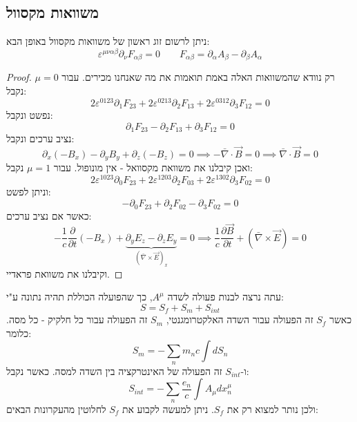 \documentclass{tstextbook}
\begin{document}
\subsection{משוואות מקסוול}

\begin{proposition}
ניתן לרשום זוג ראשון של משוואות מקסוול באופן הבא:
$$\varepsilon^{\mu \nu \alpha \beta}\partial_{\nu}F_{\alpha \beta}=0\qquad F_{\alpha \beta}=\partial_{\alpha}A_{\beta}-\partial_{\beta}A_{\alpha}$$

\end{proposition}
\begin{proof}
רק נוודא שהמשוואות האלה באמת תואמות את מה שאנחנו מכירים. עבור \(\mu=0\) נקבל:
$$2\varepsilon^{0123}\partial_{1}F_{23}+2\varepsilon^{0213}\partial_{2}F_{13}+2\varepsilon^{0312}\partial_{3}F_{12}=0$$
נפשט ונקבל:
$$\partial_{1}F_{23}-\partial_{2}F_{13}+\partial_{3}F_{12}=0$$
נציב ערכים ונקבל:
$$\partial_{x} (-B_{x})-\partial_{y}B_{y}+\partial_{z}(-B_{z})=0\implies -\bar{\nabla} \cdot \vec{B}=0\implies \bar{\nabla} \cdot \vec{B}=0$$
ואכן קיבלנו את משוואת מקסוואל - אין מונופול.
עבור \(\mu=1\) נקבל:
$$2\varepsilon^{1023}\partial_{0} F_{23}+2\varepsilon^{1203}\partial _{2}F_{03}+2\varepsilon^{1302}\partial_{3}F_{02}=0$$
וניתן לפשט:
$$-\partial_{0}F_{23}+\partial_{2}F_{02}-\partial_{3}F_{02}=0$$
כאשר אם נציב ערכים:
$$-\frac{1}{c}\frac{\partial }{\partial t} (-B_{x})+\underbrace{ \partial_{y}E_{z}-\partial_{z}E_{y} }_{ \left( \bar{\nabla} \times \vec{E} \right)_{x} }=0\implies \frac{1}{c}\frac{\partial \vec{B}}{\partial t} +\left( \bar{\nabla} \times \vec{E} \right)=0$$
וקיבלנו את משוואת פראדיי.

\end{proof}
עתה נרצה לבנות פעולה לשדה \(A^\mu\), כך שהפועלה הכוללת תהיה נתונה ע"י:
$$S=S_{f}+S_{m}+S_{int}$$
כאשר \(S_{f}\) זה הפעולה עבור השדה האלקטרומגנטי, \(S_{m}\) זה הפעולה עבור כל חלקיק - כל מסה. כלומר:
$$S_{m}=-\sum_{n}m_{n}c\int dS_{n}$$
ו-\(S_{int}\) זה הפעולה של האינטרקציה בין השדה למסה. כאשר נקבל:
$$S_{int} = - \sum_{n} \frac{e_{n}}{c}\int A_{\mu} dx^\mu_{n}$$
ולכן נותר למצוא רק את \(S_{f}\). ניתן למעשה לקבוע את \(S_{f}\) לחלוטין מהעקרונות הבאים:
\end{document}
